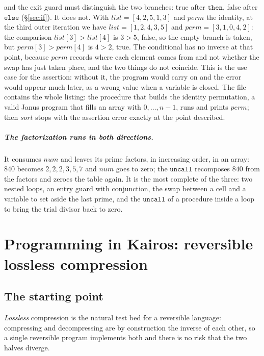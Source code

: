 \noindent
and the exit guard must distinguish the two branches: true after $\mathtt{then}$,
false after $\mathtt{else}$ (\S\ref{sec:if}). It does not. With
$\mathit{list} = [4,2,5,1,3]$ and $\mathit{perm}$ the identity, at the third outer
iteration we have $\mathit{list} = [1,2,4,3,5]$ and $\mathit{perm} = [3,1,0,4,2]$: the
comparison $\mathit{list}[3] > \mathit{list}[4]$ is $3 > 5$, false, so the empty
branch is taken, but $\mathit{perm}[3] > \mathit{perm}[4]$ is $4 > 2$, true.
The conditional has no inverse at that point, because $\mathit{perm}$ records where
each element comes from and not whether the swap has just taken place, and the two things
do not coincide. This is the use case for the assertion: without it, the program
would carry on and the error would appear much later, as a wrong value
when a variable is closed. The file contains the whole listing: the
procedure that builds the identity permutation, a valid Janus program
that fills an array with $0,\dots,n-1$, runs and prints $\mathit{perm}$; then
$\mathit{sort}$ stops with the assertion error exactly at the point
described.

\paragraph{The factorization runs in both directions.} It consumes
$\mathit{num}$ and leaves its prime factors, in increasing order, in an array:
$840$ becomes $2, 2, 2, 3, 5, 7$ and $\mathit{num}$ goes to zero; the
$\mathtt{uncall}$ recomposes $840$ from the factors and zeroes the table again. It is the most
complete of the three: two nested loops, an entry guard with conjunction,
the swap between a cell and a variable to set aside the last prime, and
the $\mathtt{uncall}$ of a procedure inside a loop to bring the trial
divisor back to zero.

\chapter{Programming in Kairos: reversible lossless compression}
\label{chap:programmare}
\label{sec:prog}

\section{The starting point}

\emph{Lossless} compression is the natural test bed for a reversible language:
compressing and decompressing are by construction the inverse of each other, so
a single reversible program implements both and there is no risk that the two
halves diverge.

